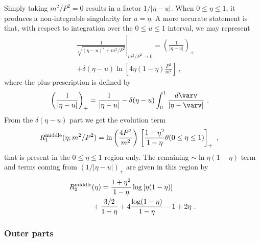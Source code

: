 \documentclass[final,5p,times,twocolumn]{elsarticle}
\newcommand{\nn}{\nonumber \\ }
\begin{document}
Simply taking $m^2/P^2 = 0 $  results in  a factor $1/|\eta -u|$.
When $0\leq \eta \leq 1$, 
it produces 
 a  non-integrable singularity 
 for $u=\eta$. 
 A more accurate  statement is that, 
with respect to integration over the $0\leq u \leq 1$ interval, we may represent 
     \begin{align}
&  \left. \frac{1 }{\sqrt{(\eta  -u )^2+m^2/ P^2}} \right |_{m^2/P^2 \to 0}= \left ( \frac{1}{|\eta -u|} \right )_+ 
  \nn & +
 \delta (\eta- u)  \ln  \left [ 4\eta (1-\eta) \frac{P^2 }{m^2} \right ] 
  \  , 
 \label{yeta}
\end{align} 
where   the plus-prescription  is defined by 
 \begin{align}
  & \left ( \frac{1}{|\eta-u|} \right )_+ = \frac{1}{|\eta -u|}  - \delta (\eta -u)
 \int_0^1 \frac{d\varv}{|\eta-\varv|} 
  \  . 
\end{align} 
From the $ \delta (\eta -u)$ part we get  the evolution  term 
 \begin{align}
 R_1^{\rm middle} &(\eta; m^2/P^2)  =\ln \left (\frac{4P^2}{m^2} \right )  \,
 \left [ \frac{1+\eta^2}{1-\eta} \theta (0\leq \eta \leq 1 )\right ]_+
 \ ,
 \label{Rmid}
\end{align} 
that is present in the   $0\leq \eta \leq 1$ region only.  
The remaining $\sim \ln \eta (1-\eta )$ term and 
terms  coming  from $(1/|\eta-u|)_+$
 are given   in this region  by 
    \begin{align}
  R_2^{\rm middle } & (\eta) =
 \frac{1+\eta^2}{1-\eta} \log \left [\eta  (1-\eta)  
   \right]
\nn & +\frac{3/2}{ 1-\eta} +4\frac{\log (1-\eta)}{1-\eta} - 1+2 \eta \   . 
\label{central}
   \end{align} 
   

\subsubsection{Outer parts} 
\end{document}
